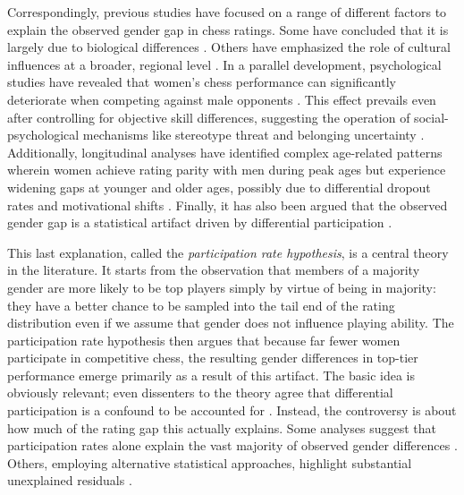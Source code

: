 \documentclass[9pt,twocolumn,twoside,lineno]{pnas-new}
\begin{document}
Correspondingly, previous studies have focused on a range of different factors to explain the observed gender gap in chess ratings. Some have concluded that it is largely due to biological differences \cite{howard2014jbs, howard2014explaining}. Others have emphasized the role of cultural influences at a broader, regional level \cite{blanch2023spatial}. In a parallel development, psychological studies have revealed that women's chess performance can significantly deteriorate when competing against male opponents \cite{de2022micro, backus2023gender}. This effect prevails even after controlling for objective skill differences, suggesting the operation of social-psychological mechanisms like stereotype threat and belonging uncertainty \cite{smerdon2020female}. Additionally, longitudinal analyses have identified complex age-related patterns wherein women achieve rating parity with men during peak ages but experience widening gaps at younger and older ages, possibly due to differential dropout rates and motivational shifts \cite{chassy2023delusion}. Finally, it has also been argued that the observed gender gap is a statistical artifact driven by differential participation \cite{charness1996participation, chabris2006sex, bilalic2009best}.

This last explanation, called the \emph{participation rate hypothesis}, is a central theory in the literature. It starts from the observation that members of a majority gender are more likely to be top players simply by virtue of being in majority: they have a better chance to be sampled into the tail end of the rating distribution even if we assume that gender does not influence playing ability. The participation rate hypothesis then argues that because far fewer women participate in competitive chess, the resulting gender differences in top-tier performance emerge primarily as a result of this artifact. The basic idea is obviously relevant; even dissenters to the theory agree that differential participation is a confound to be accounted for \cite{knapp2010prsb, howard2014jbs, howard2014explaining, wiesend2019questioning}. Instead, the controversy is about how much of the rating gap this actually explains. Some analyses suggest that participation rates alone explain the vast majority of observed gender differences \cite{bilalic2009best}. Others, employing alternative statistical approaches, highlight substantial unexplained residuals \cite{knapp2010prsb, blanch2016expert, wiesend2019questioning}.
\end{document}
